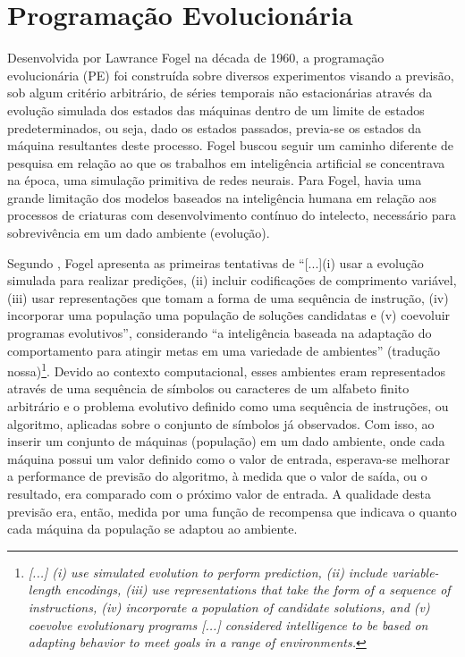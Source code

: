 \section{Programação Evolucionária}

Desenvolvida por Lawrance Fogel na década de 1960, a programação evolucionária (PE) foi construída sobre diversos experimentos visando a previsão, sob algum critério arbitrário, de séries temporais não estacionárias através da evolução simulada dos estados das máquinas dentro de um limite de estados predeterminados, ou seja, dado os estados passados, previa-se os estados da máquina resultantes deste processo. Fogel buscou seguir um caminho diferente de pesquisa em relação ao que os trabalhos em inteligência artificial se concentrava na época, uma simulação primitiva de redes neurais. Para Fogel, havia uma grande limitação dos modelos baseados na inteligência humana em relação aos processos de criaturas com desenvolvimento contínuo do intelecto, necessário para sobrevivência em um dado ambiente (evolução).

Segundo \cite[pg.A2.3:3]{back_handbook_1997}, Fogel apresenta as primeiras tentativas de \enquote{[...](i) usar a evolução simulada para realizar predições, (ii) incluir codificações de comprimento variável, (iii) usar representações que tomam a forma de uma sequência de instrução, (iv) incorporar uma população uma população de soluções candidatas e (v) coevoluir programas evolutivos}, considerando \enquote{a inteligência baseada na adaptação do comportamento para atingir metas em uma variedade de ambientes} (tradução nossa)\footnote{\textit{[...] (i) use simulated evolution to perform prediction, (ii) include variable-length encodings, (iii) use representations that take the form of a sequence of instructions, (iv) incorporate a population of candidate solutions, and (v) coevolve evolutionary programs [...] considered intelligence to be based on adapting behavior to meet goals in a range of environments.}}. Devido ao contexto computacional, esses ambientes eram representados através de uma sequência de símbolos ou caracteres de um alfabeto finito arbitrário e o problema evolutivo definido como uma sequência de instruções, ou algoritmo, aplicadas sobre o conjunto de símbolos já observados. Com isso, ao inserir um conjunto de máquinas (população) em um dado ambiente, onde cada máquina possui um valor definido como o valor de entrada, esperava-se melhorar a performance de previsão do algoritmo, à medida que o valor de saída, ou o resultado, era comparado com o próximo valor de entrada. A qualidade desta previsão era, então, medida por uma função de recompensa que indicava o quanto cada máquina da população se adaptou ao ambiente.

